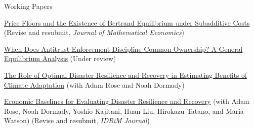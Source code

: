 \documentclass{resume} %
\begin{document}
\begin{rSection}{Working Papers}
\vspace{-1em}
\item
\href{https://dx.doi.org/10.2139/ssrn.6967764}{Price Floors and the Existence of Bertrand Equilibrium under Subadditive Costs} (Revise and resubmit, \textit{Journal of Mathematical Economics})

 \item 
 \href{https://dx.doi.org/10.2139/ssrn.6880904}{When Does Antitrust Enforcement Discipline Common
Ownership? A General Equilibrium Analysis} (Under review)




\item 
\href{https://dx.doi.org/10.2139/ssrn.6730418}{The Role of Optimal Disaster Resilience and Recovery in Estimating Benefits of Climate Adaptation} (with Adam Rose and Noah Dormady)

\item 
\href{https://dx.doi.org/10.2139/ssrn.5925602}{Economic Baselines for Evaluating Disaster Resilience and Recovery} (with Adam Rose, Noah Dormady, Yoshio Kajitani, Huan Liu, Hirokazu Tatano, and Maria Watson) (Revise and resubmit, \textit{IDRiM Journal})







\end{rSection}
\end{document}
